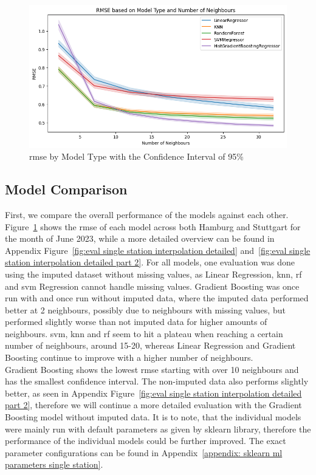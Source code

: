 \begin{figure}[ht]
  \centering
  \includegraphics[width=1\textwidth]{images/rmse_by_model_type.png}
  \caption{\gls{rmse} by Model Type with the Confidence Interval of 95\%}
  \label{fig:rmse by model type}
\end{figure}

\subsection{Model Comparison}

First, we compare the overall performance of the models against each other. Figure~\ref{fig:rmse by model type} shows the \gls{rmse} of each model across both Hamburg and Stuttgart for the month of June 2023, while a more detailed overview can be found in Appendix Figure~\ref{fig:eval single station interpolation detailed} and~\ref{fig:eval single station interpolation detailed part 2}. For all models, one evaluation was done using the imputed dataset without missing values, as Linear Regression, \gls{knn}, \gls{rf} and \gls{svm} Regression cannot handle missing values. Gradient Boosting was once run with and once run without imputed data, where the imputed data performed better at 2 neighbours, possibly due to neighbours with missing values, but performed slightly worse than not imputed data for higher amounts of neighbours. \gls{svm}, \gls{knn} and \gls{rf} seem to hit a plateau when reaching a certain number of neighbours, around 15-20, whereas Linear Regression and Gradient Boosting continue to improve with a higher number of neighbours.\\
Gradient Boosting shows the lowest \gls{rmse} starting with over 10 neighbours and has the smallest confidence interval. The non-imputed data also performs slightly better, as seen in Appendix Figure~\ref{fig:eval single station interpolation detailed part 2}, therefore we will continue a more detailed evaluation with the Gradient Boosting model without imputed data. It is to note, that the individual models were mainly run with default parameters as given by sklearn library, therefore the performance of the individual models could be further improved. The exact parameter configurations can be found in Appendix~\ref{appendix: sklearn ml parameters single station}.

